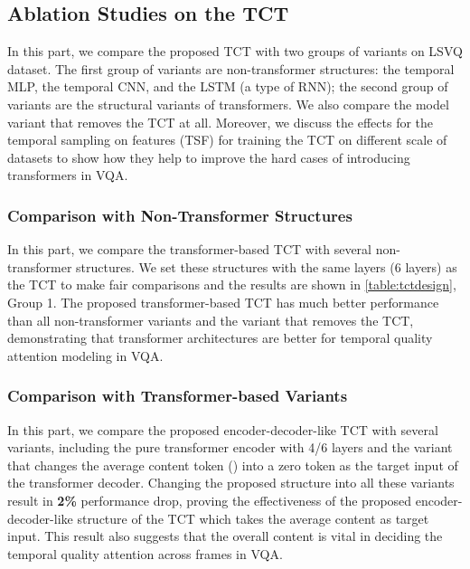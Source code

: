 \documentclass[journal]{IEEEtran}
\begin{document}
\subsection{Ablation Studies on the TCT} \label{sec:abltct}

In this part, we compare the proposed TCT with two groups of variants on LSVQ dataset. The first group of variants are non-transformer structures: the temporal MLP, the temporal CNN, and the LSTM (a type of RNN); the second group of variants are the structural variants of transformers. We also compare the model variant that removes the TCT at all. Moreover, we discuss the effects for the temporal sampling on features (TSF) for training the TCT on different scale of datasets to show how they help to improve the hard cases of introducing transformers in VQA.

\subsubsection{Comparison with Non-Transformer Structures} In this part, we compare the transformer-based TCT with several non-transformer structures. We set these structures with the same layers (6 layers) as the TCT to make fair comparisons and the results are shown in \cref{table:tctdesign}, Group 1. The proposed transformer-based TCT has much better performance than all non-transformer variants and the variant that removes the TCT, demonstrating that transformer architectures are better for temporal quality attention modeling in VQA.

\subsubsection{Comparison with Transformer-based Variants} In this part, we compare the proposed encoder-decoder-like TCT with several variants, including the pure transformer encoder with 4/6 layers and the variant that changes the average content token () into a zero token as the target input of the transformer decoder. Changing the proposed structure into all these variants result in \textbf{2\%} performance drop, proving the effectiveness of the proposed encoder-decoder-like structure of the TCT which takes the average content as target input. This result also suggests that the overall content is vital in deciding the temporal quality attention across frames in VQA.
\end{document}
